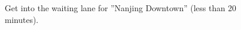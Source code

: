\documentclass[11pt]{article}
\begin{document}
\begin{figure}[!h]
\begin{minipage}[t]{.5\textwidth}
    \end{minipage}%
	\caption{Get into the waiting lane for ''Nanjing Downtown'' (less than 20 minutes).}
 \end{figure}
\end{document}
